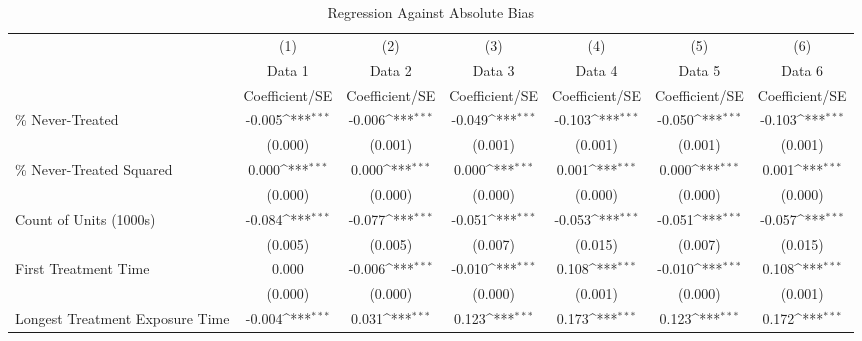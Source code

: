\begin{table}[htbp]\centering
\def\sym#1{\ifmmode^{#1}\else\(^{#1}\)\fi}
\caption{Regression Against Absolute Bias}
\begin{tabular}{l*{6}{c}}
\hline\hline
                    &\multicolumn{1}{c}{(1)}&\multicolumn{1}{c}{(2)}&\multicolumn{1}{c}{(3)}&\multicolumn{1}{c}{(4)}&\multicolumn{1}{c}{(5)}&\multicolumn{1}{c}{(6)}\\
                    &\multicolumn{1}{c}{Data 1}&\multicolumn{1}{c}{Data 2}&\multicolumn{1}{c}{Data 3}&\multicolumn{1}{c}{Data 4}&\multicolumn{1}{c}{Data 5}&\multicolumn{1}{c}{Data 6}\\
                    &Coefficient/SE         &Coefficient/SE         &Coefficient/SE         &Coefficient/SE         &Coefficient/SE         &Coefficient/SE         \\
\hline
\% Never-Treated    &      -0.005\sym{***}&      -0.006\sym{***}&      -0.049\sym{***}&      -0.103\sym{***}&      -0.050\sym{***}&      -0.103\sym{***}\\
                    &     (0.000)         &     (0.001)         &     (0.001)         &     (0.001)         &     (0.001)         &     (0.001)         \\
\% Never-Treated Squared&       0.000\sym{***}&       0.000\sym{***}&       0.000\sym{***}&       0.001\sym{***}&       0.000\sym{***}&       0.001\sym{***}\\
                    &     (0.000)         &     (0.000)         &     (0.000)         &     (0.000)         &     (0.000)         &     (0.000)         \\
Count of Units (1000s)&      -0.084\sym{***}&      -0.077\sym{***}&      -0.051\sym{***}&      -0.053\sym{***}&      -0.051\sym{***}&      -0.057\sym{***}\\
                    &     (0.005)         &     (0.005)         &     (0.007)         &     (0.015)         &     (0.007)         &     (0.015)         \\
First Treatment Time&       0.000         &      -0.006\sym{***}&      -0.010\sym{***}&       0.108\sym{***}&      -0.010\sym{***}&       0.108\sym{***}\\
                    &     (0.000)         &     (0.000)         &     (0.000)         &     (0.001)         &     (0.000)         &     (0.001)         \\
Longest Treatment Exposure Time&      -0.004\sym{***}&       0.031\sym{***}&       0.123\sym{***}&       0.173\sym{***}&       0.123\sym{***}&       0.172\sym{***}\\

\end{tabular}
\end{table}
